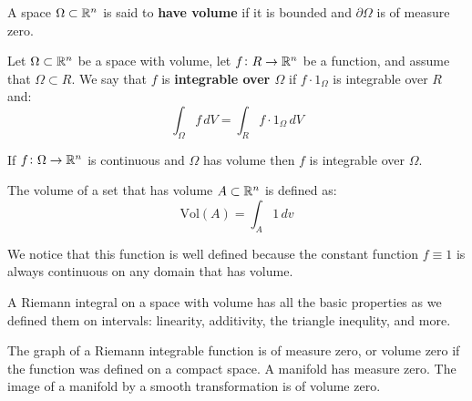 \documentclass[11pt,a4paper]{article}
\begin{document}
\begin{definition}
  A space $\Omega \subset \mathbb{R}^n$ is said to \textbf{have volume}
  if it is bounded and $\partial \Omega$ is of measure zero.
\end{definition}
\begin{definition}
  Let $\Omega \subset \mathbb{R}^n$ be a space with volume, let
  $f \colon R \to \mathbb{R}^n$ be a function, and assume that
  $\Omega \subset R$. We say that $f$ is 
  \textbf{integrable over $\Omega$} if $f\cdot1_\Omega$
  is integrable over $R$ and:
  \[
    \int_{\Omega}{f\,dV} = \int_{R}{f\cdot1_\Omega\,dV}
  \]
\end{definition}
\begin{theorem}
  If $f \colon \Omega \to \mathbb{R}^n$ is continuous and $\Omega$
  has volume then $f$ is integrable over $\Omega$.
\end{theorem}
\begin{definition}
  The volume of a set that has volume $A \subset \mathbb{R}^n$ is 
  defined as:
  \[
    \mathrm{Vol}(A) = \int_{A}{1\,dv}
  \]
\end{definition}
We notice that this function is well defined because the constant
function $f \equiv 1$ is always continuous on any domain that
has volume.
\begin{remark}
  A Riemann integral on a space with volume has all the basic
  properties as we defined them on intervals: linearity,
  additivity, the triangle inequlity, and more. 
\end{remark}
\begin{theorem}
  The graph of a Riemann integrable function is of measure 
  zero, or volume zero if the function was defined on a
  compact space. A manifold has measure zero. The image
  of a manifold by a smooth transformation is of volume zero. 
\end{theorem}
\end{document}
